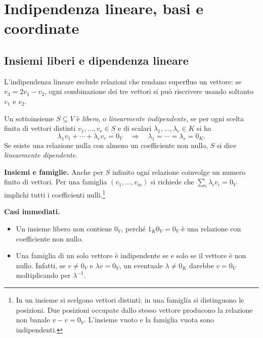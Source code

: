 
\section{Indipendenza lineare, basi e coordinate}

\subsection{Insiemi liberi e dipendenza lineare}

L'indipendenza lineare esclude relazioni che rendano superfluo un vettore: se $v_3=2v_1-v_2$, ogni combinazione dei tre vettori si può riscrivere usando soltanto $v_1$ e $v_2$.

\begin{definizione}
Un sottoinsieme $S\subseteq V$ è \emph{libero}, o \emph{linearmente indipendente}, se per ogni scelta finita di vettori distinti $v_1,\ldots,v_r\in S$ e di scalari $\lambda_1,\ldots,\lambda_r\in K$ si ha
\[
  \lambda_1v_1+\cdots+\lambda_rv_r=0_V
  \quad\Longrightarrow\quad \lambda_1=\cdots=\lambda_r=0_K.
\]
Se esiste una relazione nulla con almeno un coefficiente non nullo, $S$ si dice \emph{linearmente dipendente}.
\end{definizione}

\textbf{Insiemi e famiglie.} Anche per $S$ infinito ogni relazione coinvolge un numero finito di vettori. Per una famiglia $(v_1,\ldots,v_m)$ si richiede che $\sum_i\lambda_iv_i=0_V$ implichi tutti i coefficienti nulli.\footnote{In un insieme si scelgono vettori distinti; in una famiglia si distinguono le posizioni. Due posizioni occupate dallo stesso vettore producono la relazione non banale $v-v=0_V$. L'insieme vuoto e la famiglia vuota sono indipendenti.}

\textbf{Casi immediati.}
\begin{itemize}
  \item Un insieme libero non contiene $0_V$, perché $1_K0_V=0_V$ è una relazione con coefficiente non nullo.
  \item Una famiglia di un solo vettore è indipendente se e solo se il vettore è non nullo. Infatti, se $v\ne0_V$ e $\lambda v=0_V$, un eventuale $\lambda\ne0_K$ darebbe $v=0_V$ moltiplicando per $\lambda^{-1}$.
\end{itemize}

